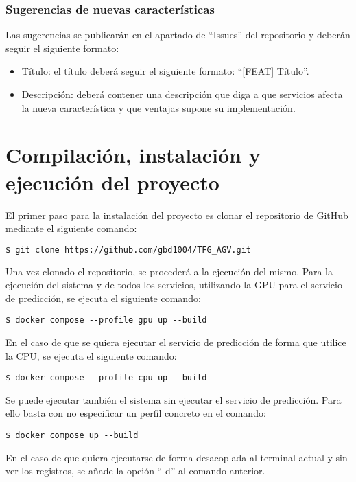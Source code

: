 \subsubsection{Sugerencias de nuevas características}
Las sugerencias se publicarán en el apartado de ``Issues'' del repositorio y deberán seguir el siguiente formato:
\begin{itemize}
    \item Título: el título deberá seguir el siguiente formato: ``[FEAT] Título''.
    \item Descripción: deberá contener una descripción que diga a que servicios afecta la nueva característica y 
        que ventajas supone su implementación.
\end{itemize}

\section{Compilación, instalación y ejecución del proyecto}

El primer paso para la instalación del proyecto es clonar el repositorio de GitHub mediante el siguiente comando:
\begin{lstlisting}[language=bash]
$ git clone https://github.com/gbd1004/TFG_AGV.git
\end{lstlisting}

Una vez clonado el repositorio, se procederá a la ejecución del mismo. Para la ejecución del sistema y de 
todos los servicios, utilizando la GPU para el servicio de predicción, se ejecuta el siguiente comando:
\begin{lstlisting}
$ docker compose --profile gpu up --build
\end{lstlisting}
En el caso de que se quiera ejecutar el servicio de predicción de forma que utilice la CPU, se ejecuta el 
siguiente comando:
\begin{lstlisting}
$ docker compose --profile cpu up --build
\end{lstlisting}

Se puede ejecutar también el sistema sin ejecutar el servicio de predicción. Para ello basta con no especificar 
un perfil concreto en el comando:
\begin{lstlisting}
$ docker compose up --build
\end{lstlisting}

En el caso de que quiera ejecutarse de forma desacoplada al terminal actual y sin ver los registros, se añade 
la opción ``-d'' al comando anterior.

